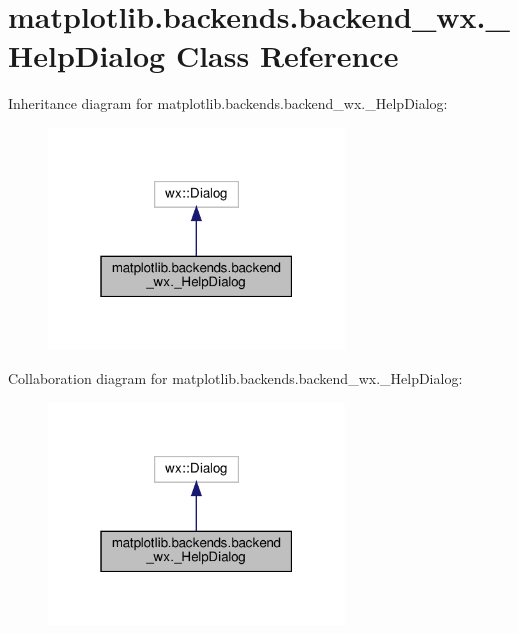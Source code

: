 \hypertarget{classmatplotlib_1_1backends_1_1backend__wx_1_1__HelpDialog}{}\section{matplotlib.\+backends.\+backend\+\_\+wx.\+\_\+\+Help\+Dialog Class Reference}
\label{classmatplotlib_1_1backends_1_1backend__wx_1_1__HelpDialog}


Inheritance diagram for matplotlib.\+backends.\+backend\+\_\+wx.\+\_\+\+Help\+Dialog\+:
\nopagebreak
\begin{figure}[H]
\begin{center}
\leavevmode
\includegraphics[width=223pt]{classmatplotlib_1_1backends_1_1backend__wx_1_1__HelpDialog__inherit__graph}
\end{center}
\end{figure}


Collaboration diagram for matplotlib.\+backends.\+backend\+\_\+wx.\+\_\+\+Help\+Dialog\+:
\nopagebreak
\begin{figure}[H]
\begin{center}
\leavevmode
\includegraphics[width=223pt]{classmatplotlib_1_1backends_1_1backend__wx_1_1__HelpDialog__coll__graph}
\end{center}
\end{figure}
